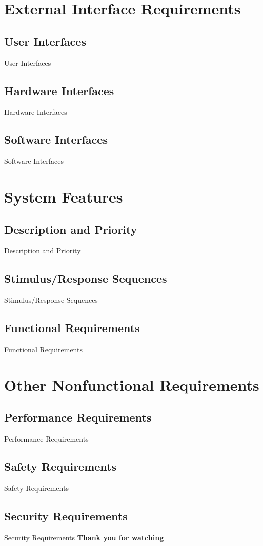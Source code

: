\documentclass{article}
\begin{document}
\begin{CJK}{UTF8}{bkai}
\section{\huge\bf  \color{blue} External Interface Requirements\\}
\subsection{\Large User Interfaces\\}
User Interfaces
\newpage
\subsection{\Large Hardware Interfaces\\}
Hardware Interfaces
\newpage
\subsection{\Large Software Interfaces\\}
 Software Interfaces
\newpage



\section{\huge\bf \color{blue}  System Features }
\subsection{\Large Description and Priority }
 Description and Priority 
\newpage
\subsection{\Large Stimulus/Response Sequences}
Stimulus/Response Sequences
\newpage
\subsection{ \Large Functional Requirements}
 Functional Requirements
\newpage


\section{\huge\bf  \color {blue}  Other Nonfunctional Requirements }
\subsection{ \Large Performance Requirements}
 Performance Requirements
\newpage
\subsection{\Large Safety Requirements }
Safety Requirements
\newpage
\subsection{ \Large Security Requirements }
 Security Requirements
\newpage
\Huge\bf   Thank you for watching


\end{CJK}
\end{document}

